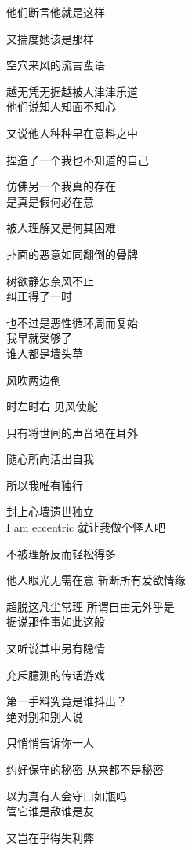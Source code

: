 他们断言他就是这样

又揣度她该是那样

{\color{red}空穴来风}的流言蜚语

越无凭无据越被人津津乐道
\\

他们说知人知面不知心

又说他人种种早在意料之中

捏造了一个我也不知道的自己

仿佛另一个我真的存在
\\

是真是假何必在意

被人理解又是何其困难

扑面的恶意如同翻倒的骨牌

树欲静怎奈风不止
\\

纠正得了一时

也不过是恶性循环周而复始
\\

我早就受够了
\\

谁人都是墙头草

风吹两边倒

时左时右 见风使舵

只有将世间的声音堵在耳外

随心所向活出自我

所以我唯有独行

封上心墙遗世独立
\\

I am eccentric 就让我做个怪人吧

不被理解反而轻松得多

他人眼光无需在意 斩断所有爱欲情缘

超脱这凡尘常理 所谓自由无外乎是
\\

据说那件事如此这般

又听说其中另有隐情

充斥臆测的传话游戏

第一手料究竟是谁抖出？
\\

绝对别和别人说

只悄悄告诉你一人

约好保守的秘密 从来都不是秘密

以为真有人会守口如瓶吗
\\

管它谁是敌谁是友

又岂在乎得失利弊


